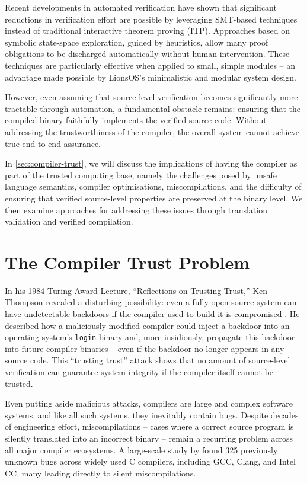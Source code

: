Recent developments in automated verification have shown that significant reductions in verification effort are possible by leveraging SMT-based techniques instead of traditional interactive theorem proving (ITP). Approaches based on symbolic state-space exploration, guided by heuristics, allow many proof obligations to be discharged automatically without human intervention. These techniques are particularly effective when applied to small, simple modules -- an advantage made possible by LionsOS’s minimalistic and modular system design.

However, even assuming that source-level verification becomes significantly more tractable through automation, a fundamental obstacle remains: ensuring that the compiled binary faithfully implements the verified source code. Without addressing the trustworthiness of the compiler, the overall system cannot achieve true end-to-end assurance. 

In \autoref{sec:compiler-trust}, we will discuss the implications of having the compiler as part of the trusted computing base, namely the challenges posed by unsafe language semantics, compiler optimisations, miscompilations, and the difficulty of ensuring that verified source-level properties are preserved at the binary level. We then examine approaches for addressing these issues through translation validation and verified compilation.

\section{The Compiler Trust Problem}
\label{sec:compiler-trust}
In his 1984 Turing Award Lecture, “Reflections on Trusting Trust,” Ken Thompson revealed a disturbing possibility: even a fully open-source system can have undetectable backdoors if the compiler used to build it is compromised \citep{thompson1984trust}. He described how a maliciously modified compiler could inject a backdoor into an operating system’s \texttt{login} binary and, more insidiously, propagate this backdoor into future compiler binaries -- even if the backdoor no longer appears in any source code. This ``trusting trust'' attack shows that no amount of source-level verification can guarantee system integrity if the compiler itself cannot be trusted.

Even putting aside malicious attacks, compilers are large and complex software systems, and like all such systems, they inevitably contain bugs. Despite decades of engineering effort, miscompilations -- cases where a correct source program is silently translated into an incorrect binary -- remain a recurring problem across all major compiler ecosystems. A large-scale study by \cite{yang2011compilerbugs} found 325 previously unknown bugs across widely used C compilers, including GCC, Clang, and Intel CC, many leading directly to silent miscompilations.


